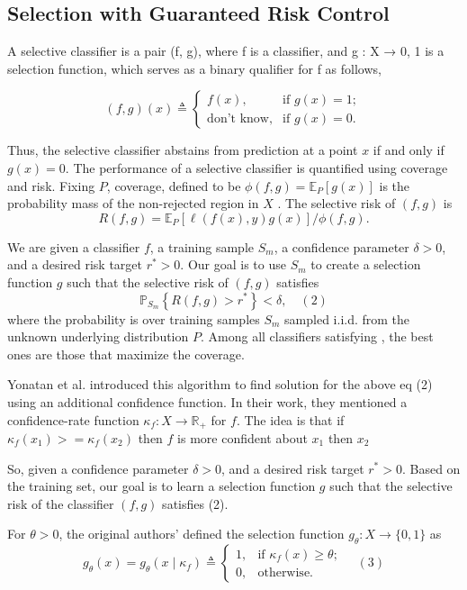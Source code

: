 \documentclass[
	english,
	accentcolor=8b,
	type=intern,
	marginpar=false
	]{tudapub}
\begin{document}
\subsection{Selection with Guaranteed Risk Control}
A selective classifier  is a pair (f, g), where f is a classifier, and g : X → {0, 1} is a selection
function, which serves as a binary qualifier for f as follows,


\[
(f, g)(x) \triangleq
\begin{cases} 
    f(x), & \text{if } g(x) = 1; \\
    \text{don't know}, & \text{if } g(x) = 0.
\end{cases}
\]

Thus, the selective classifier abstains from prediction at a point $x$ if and only if $g(x) = 0$. The performance of a selective classifier is quantified using coverage and risk. Fixing $P$, coverage, defined to be $\phi(f, g) = \mathbb{E}_P[g(x)]$
is the probability mass of the non-rejected region in $X$ \cite{whitehead2022reliablevisualquestionanswering}. The selective risk of $(f, g)$ is \[
R(f, g) = \mathbb{E}_P[\ell(f(x), y)g(x)] / \phi(f, g).
\]

We are given a classifier $f$, a training sample $S_m$, a confidence parameter $\delta > 0$, and a desired risk target $r^* > 0$. Our goal is to use $S_m$ to create a selection function $g$ such that the selective risk of $(f, g)$ satisfies
\[
\mathbb{P}_{S_m} \left\{ R(f, g) > r^* \right\} < \delta, \quad (2)
\]
where the probability is over training samples $S_m$ sampled i.i.d. from the unknown underlying distribution $P$. Among all classifiers satisfying , the best ones are those that maximize the coverage.


Yonatan et al. introduced this algorithm to find solution for the above eq \quad(2) using an additional confidence function.
In their work, they mentioned a confidence-rate function $\kappa_f : X \rightarrow \mathbb{R}_{+}$ for $f$.
The idea is that if $\kappa_f ( x_1) >= \kappa_f (x_2)$ then $f$ is more confident about $x_1$ then $x_2$
\hfill 

So, given a confidence parameter $\delta > 0$, and a desired risk target $r^* > 0$. Based on the training set, our goal is to learn a selection function $g$ such that the selective risk of the classifier $(f, g)$ satisfies (2).

For $\theta > 0$, the original authors' defined the selection function $g_\theta : X \to \{0, 1\}$ as
\[
g_\theta(x) = g_\theta(x \mid \kappa_f) \triangleq 
\begin{cases}
1, & \text{if } \kappa_f(x) \geq \theta; \\
0, & \text{otherwise}.
\end{cases} \quad (3)
\] 
\end{document}
